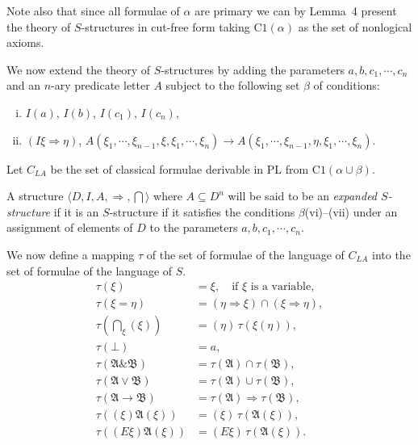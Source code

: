 \documentclass[12pt,a4paper]{article}
\begin{document}
Note also that since all formulae of $\alpha$ are primary we can by Lemma~4
present the theory of $S$-structures in cut-free form taking $\mathrm{C1}(\alpha)$
as the set of nonlogical axioms.

We now extend the theory of $S$-structures by adding the parameters
$a, b, c_1, \cdots, c_n$ and an $n$-ary predicate letter $A$ subject to the
following set $\beta$ of conditions:
\begin{enumerate}[(vi)]
\item $I(a)$, $I(b)$, $I(c_1)$, $I(c_n)$,
\item $(I\xi \Rightarrow \eta)$,
  $A(\xi_1, \cdots, \xi_{n-1}, \xi, \xi_1, \cdots, \xi_n)
   \to A(\xi_1, \cdots, \xi_{n-1}, \eta, \xi_1, \cdots, \xi_n)$.
\end{enumerate}

Let $C_{LA}$ be the set of classical formulae derivable in PL from
$\mathrm{C1}(\alpha \cup \beta)$.

A structure $\langle D, I, A, \Rightarrow, \bigcap\rangle$ where
$A \subseteq D^n$ will be said to be an \emph{expanded $S$-structure} if it
is an $S$-structure if it satisfies the conditions $\beta$(vi)--(vii) under
an assignment of elements of $D$ to the parameters $a, b, c_1, \cdots, c_n$.

We now define a mapping $\tau$ of the set of formulae of the language of
$C_{LA}$ into the set of formulae of the language of $S$.
\begin{align*}
\tau(\xi) &= \xi, \quad\text{if $\xi$ is a variable,}\\
\tau(\xi = \eta) &= (\eta \Rightarrow \xi) \cap (\xi \Rightarrow \eta), \\
\tau(\bigcap_\xi(\xi)) &= (\eta)\,\tau(\xi(\eta)), \\
\tau(\bot) &= a, \\
\tau(\mathfrak{A} \mathbin{\&} \mathfrak{B}) &= \tau(\mathfrak{A}) \cap \tau(\mathfrak{B}), \\
\tau(\mathfrak{A} \vee \mathfrak{B}) &= \tau(\mathfrak{A}) \cup \tau(\mathfrak{B}), \\
\tau(\mathfrak{A} \to \mathfrak{B}) &= \tau(\mathfrak{A}) \Rightarrow \tau(\mathfrak{B}), \\
\tau((\xi)\mathfrak{A}(\xi)) &= (\xi)\,\tau(\mathfrak{A}(\xi)), \\
\tau((E\xi)\mathfrak{A}(\xi)) &= (E\xi)\,\tau(\mathfrak{A}(\xi)).
\end{align*}
\end{document}
